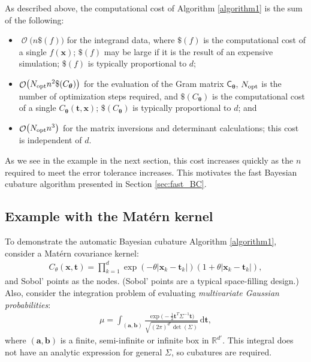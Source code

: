 \documentclass[twocolumn]{svjour3}          %
\DeclareMathOperator{\Order}{{\mathcal O}}
\newcommand{\bm}[1]{\boldsymbol{#1}}
\newcommand{\mSigma}{\mathsf{\Sigma}}
\newcommand{\dif}[1]{\text{d}{#1}}
\newcommand{\reals}{\mathbb{R}}
\newcommand{\vtheta}{{\bm{\theta}}}
\newcommand{\va}{\bm{a}}
\newcommand{\vb}{\bm{b}}
\newcommand{\vt}{\bm{t}}
\newcommand{\vx}{\bm{x}}
\newcommand{\dvt}{\dif{\bm{t}}}
\newcommand{\mC}{\mathsf{C}}
\newcommand{\opt}{{\textup{opt}}}
\begin{document}
As described above, the computational cost of Algorithm \ref{algorithm1} is the sum of the following:
\begin{itemize}
	\item $\Order\bigl(n\$(f) \bigr)$ for the integrand data, where $\$(f)$ is the computational cost of a single $f(\vx)$; $\$(f)$ may be large if it is the result of an expensive simulation; $\$(f)$ is typically proportional to $d$;
	
	\item $\Order\bigl(N_{\opt} n^2 \$(C_\vtheta) \bigr)$ for the evaluation of the Gram matrix $\mC_{\vtheta}$, $N_\opt$ is the number of optimization steps required, and  $\$(C_\vtheta)$ is the computational cost of a single $C_\vtheta(\vt,\vx)$; $\$(C_\vtheta)$ is typically proportional to $d$; and
	
	\item $\Order\bigl(N_{\opt} n^3 \bigr)$ for the matrix inversions and determinant calculations; this cost is independent of $d$.
	
\end{itemize}
As we see in the example in the next section, this cost increases quickly as the $n$ required to meet the error tolerance increases.  This motivates the fast Bayesian cubature algorithm presented in Section \ref{sec:fast_BC}.


\subsection{Example with the Mat\'ern kernel} \label{MVN_example}

To demonstrate the automatic Bayesian cubature Algorithm \ref{algorithm1}, consider a Mat\'ern covariance kernel:
\begin{align*}
C_{\theta}(\vx, \vt) = \prod_{k=1}^d \exp(-\theta|\vx_k-\vt_k|)(1+\theta |\vx_k-\vt_k|),
\end{align*}
and Sobol' points as the nodes.  (Sobol' points are a typical space-filling design.)
Also, consider the integration problem of evaluating  \emph{multivariate Gaussian probabilities}:
\begin{align}
\label{eqn:GaussDef}
\mu = \int_{(\va,\vb)} \frac{\exp\bigl(- \frac 12 \vt^T \mSigma^{-1} \vt \bigr)}{\sqrt{(2 \pi)^{d'} \det(\mSigma)}} \, \dvt,
\end{align}
where $(\va,\vb)$ is a finite, semi-infinite or infinite box in $\reals^{d'}$.  This integral does not have an analytic expression for general $\mSigma$, so cubatures are required.  
\end{document}
